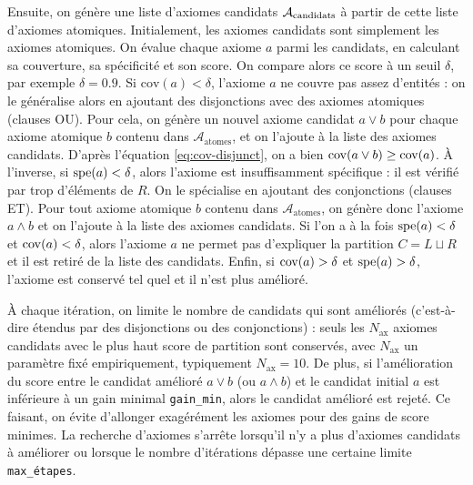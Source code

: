 Ensuite, on génère une liste d'axiomes candidats $\cal{A}_\text{candidats}$ à partir de cette liste d'axiomes atomiques. Initialement, les axiomes candidats sont simplement les axiomes atomiques. On évalue chaque axiome $a$ parmi les candidats, en calculant sa couverture, sa spécificité et son score. On compare alors ce score à un seuil $\delta$, par exemple $\delta = 0.9$. Si $\text{cov}(a) < \delta$, l'axiome $a$ ne couvre pas assez d'entités : on le généralise alors en ajoutant des disjonctions avec des axiomes atomiques (clauses OU). %
Pour cela, on génère un nouvel axiome candidat $a \lor b$ pour chaque axiome atomique $b$ contenu dans $\mathcal{A}_\text{atomes}$, 
et on l'ajoute à la liste des axiomes candidats. D'après l'équation \ref{eq:cov-disjunct}, on a bien $\cov(a \lor b) \geq \cov(a)$.
À l'inverse, si $\spe(a) < \delta$, alors l'axiome est insuffisamment spécifique : il est vérifié par trop d'éléments de $R$. 
On le spécialise en ajoutant des conjonctions (clauses ET).
Pour tout axiome atomique $b$ contenu dans $\mathcal{A}_\text{atomes}$, on génère donc l'axiome $a \land b$ et on l'ajoute à la liste des axiomes candidats. 
Si l'on a à la fois $\spe(a) < \delta$ et $\cov(a) < \delta$, alors l'axiome $a$ ne permet pas d'expliquer la partition $C = L \sqcup R$ et il est retiré de la liste des candidats. Enfin, si $\cov(a) > \delta$ et $\spe(a) > \delta$, l'axiome est conservé tel quel et il n'est plus amélioré.

À chaque itération, on limite le nombre de candidats qui sont améliorés (c'est-à-dire étendus par des disjonctions ou des conjonctions) : seuls les $N_\text{ax}$ axiomes candidats avec le plus haut score de partition sont conservés, avec $N_\text{ax}$ un paramètre fixé empiriquement, typiquement $N_\text{ax} = 10$. 
De plus, si l'amélioration du score entre le candidat amélioré $a \lor b$ (ou $a \land b$) et le candidat initial $a$ est inférieure à un gain minimal \texttt{gain\_min}, alors le candidat amélioré est rejeté. Ce faisant, on évite d'allonger exagérément les axiomes pour des gains de score minimes.
La recherche d'axiomes s'arrête lorsqu'il n'y a plus d'axiomes candidats à améliorer ou lorsque le nombre d'itérations dépasse une certaine limite \texttt{max\_étapes}. %

